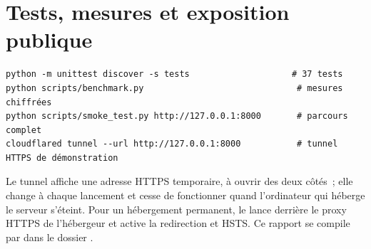 \section{Tests, mesures et exposition publique}

\begin{lstlisting}[language={}, numbers=none]
python -m unittest discover -s tests                    # 37 tests
python scripts/benchmark.py                              # mesures chiffrées
python scripts/smoke_test.py http://127.0.0.1:8000       # parcours complet
cloudflared tunnel --url http://127.0.0.1:8000           # tunnel HTTPS de démonstration
\end{lstlisting}

Le tunnel affiche une adresse \ac{HTTPS} temporaire, à ouvrir des deux côtés~; elle change à chaque lancement et cesse de fonctionner quand l'ordinateur qui héberge le serveur s'éteint. Pour un hébergement permanent, le  lance  derrière le proxy \ac{HTTPS} de l'hébergeur et  active la redirection et \ac{HSTS}. Ce rapport se compile par  dans le dossier .
